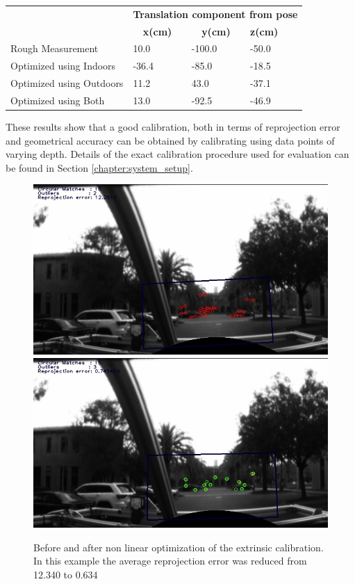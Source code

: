 \begin{center}
    \begin{tabular}{ |p{6cm}|p{2cm}|p{2cm}|p{2cm}| }%
    \hline
    & \multicolumn{3}{c|}{\bf{Translation component from pose}}  \\
    & \multicolumn{1}{c}{\bf{x(cm)}} & \multicolumn{1}{c}{\bf{y(cm)}} & \bf{z(cm)} \\ \hline
    Rough Measurement & 10.0 & -100.0 & -50.0 \\ \hline
    Optimized using Indoors & -36.4 & -85.0 & -18.5\\ \hline
    Optimized using Outdoors & 11.2 & 43.0 & -37.1 \\ \hline
    Optimized using Both & 13.0 & -92.5 & -46.9 \\ 
    \hline 
    \end{tabular}
  \label{tab:geometry}
\end{center}

These results show that a good calibration, both in terms of reprojection error and geometrical accuracy can be obtained by calibrating using data points of varying depth.
Details of the exact calibration procedure used for evaluation can be found in Section \ref{chapter:system_setup}.

\begin{figure}[h!]
  \centering
    \includegraphics[width=1.0\textwidth]{chapters/images/verify_before_opt}
    \includegraphics[width=1.0\textwidth]{chapters/images/verify_after_opt}
  \caption{Before and after non linear optimization of the extrinsic calibration.  In this example the average reprojection error was reduced from 12.340 to 0.634}
  \label{fig:before_after_g2o}
\end{figure}